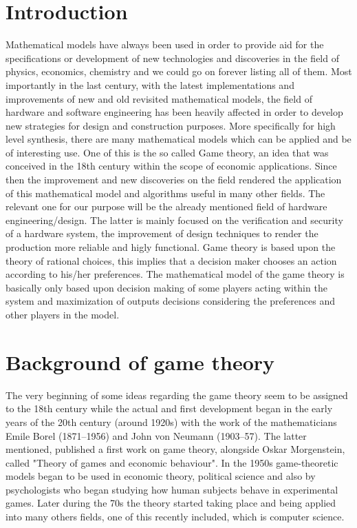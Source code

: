 \documentclass[conference]{IEEEtran}
\begin{document}
\section{Introduction}
Mathematical models have always been used in order to provide aid for the specifications or development of new technologies and discoveries in the field of physics, economics, chemistry and we could go on forever listing all of them. Most importantly in the last century, with the latest implementations and improvements of new and old revisited mathematical models, the field of hardware and software engineering has been heavily affected in order to develop new strategies for design and construction purposes. More specifically for high level synthesis, there are many mathematical models which can be applied and be of interesting use. One of this is the so called Game theory, an idea that was conceived in the 18th century within the scope of economic applications. Since then the improvement and new discoveries on the field rendered the application of this mathematical model and algorithms useful in many other fields. The relevant one for our purpose will be the already mentioned field of hardware engineering/design. The latter is mainly focused on the verification and security of a hardware system, the improvement of design techniques to render the production more reliable and higly functional. Game theory is based upon the theory of rational choices, this implies that a decision maker chooses an action according to his/her preferences. The mathematical model of the game theory is basically only based upon decision making of some players acting within the system and maximization of outputs decisions considering the preferences and other players in the model.



\section{Background of game theory}
The very beginning of some ideas regarding the game theory seem to be assigned to the 18th century while the actual and first development began in the early years of the 20th century (around 1920s) with the work of the mathematicians Emile Borel (1871–1956) and John von Neumann (1903–57). The latter mentioned, published a first work on game theory, alongside Oskar Morgenstein, called "Theory of games and economic behaviour". In the 1950s game-theoretic models began to be used in economic theory, political science and also by psychologists who began studying how human subjects behave in experimental games. Later during the 70s the theory started taking place and being applied into many others fields, one of this recently included, which is computer science\cite{b1}.
\end{document}
